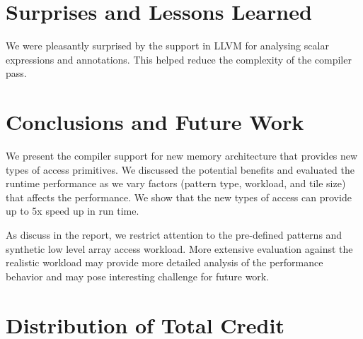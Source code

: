 \documentclass[letterpaper]{article}
\begin{document}
\section{Surprises and Lessons Learned}
We were pleasantly surprised by the support in LLVM for analysing scalar expressions and annotations.
This helped reduce the complexity of the compiler pass.

\section{Conclusions and Future Work}

We present the compiler support for new memory architecture that provides new types of access primitives. We discussed the potential benefits and evaluated the runtime performance as we vary factors (pattern type, workload, and tile size) that affects the performance. We show that the new types of access can provide up to 5x speed up in run time. 

As discuss in the report, we restrict attention to the pre-defined patterns and synthetic low level array access workload. More extensive evaluation against the realistic workload may provide more detailed analysis of the performance behavior and may pose interesting challenge for future work. 


\section{Distribution of Total Credit}



\end{document}
